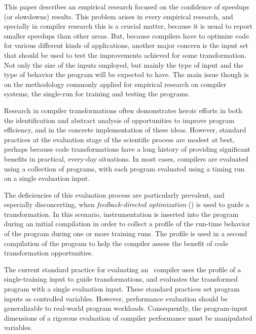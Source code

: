 
This paper describes an empirical research focused on the confidence of speedups (or slowdowns) results. This problem arises in every empirical research, and specially in compiler research this is a crucial matter, because it is usual to report smaller speedups than other areas. But, because compilers have to optimize code for various different kinds of applications, another major concern is the input set that should be used to test the improvements achieved for some transformation. Not only the size of the inputs employed, but mainly the type of input and the type of behavior the program will be expected to have. The main issue though is on the methodology commonly applied for empirical research on compiler systems, the single-run for training and testing the programs.

Research in compiler transformations often demonstrates heroic efforts in both the identification and abstract analysis of opportunities to improve program efficiency, and in the concrete implementation of these ideas.  However, standard practices at the evaluation stage of the scientific process are modest at best, perhaps because code transformations have a long history of providing significant benefits in practical, every-day situations.  In most cases, compilers are evaluated using a collection of programs, with each program evaluated using a timing run on a single evaluation input.

The deficiencies of this evaluation process are particularly prevalent, and especially disconcerting, when {\it feedback-directed optimization} (\FDO) is used to guide a transformation.  In this scenario, instrumentation is inserted into the program during an initial compilation in order to collect a profile of the run-time behavior of the program during one or more training runs.  The profile is used in a second compilation of the program to help the compiler assess the benefit of code transformation opportunities.  

The current standard practice for evaluating an \FDO\ compiler uses the profile of a single-training input to guide transformations, and evaluates the transformed program with a single evaluation input.  These standard practices set program inputs as controlled variables.  However, performance evaluation should be generalizable to real-world program workloads. Consequently, the program-input dimensions of a rigorous evaluation of compiler performance must be manipulated variables.


